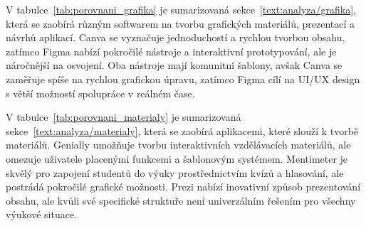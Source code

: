 V tabulce~\ref{tab:porovnani_grafika} je sumarizovaná sekce~\ref{text:analyza/grafika}, která se zaobírá různým softwarem na tvorbu grafických materiálů, prezentací a návrhů aplikací.
Canva se vyznačuje jednoduchostí a rychlou tvorbou obsahu, zatímco Figma nabízí pokročilé nástroje a interaktivní prototypování, ale je náročnější na osvojení. Oba nástroje mají komunitní šablony, avšak Canva se zaměřuje spíše na rychlou grafickou úpravu, zatímco Figma cílí na UI/UX design s větší možností spolupráce v reálném čase.


\begin{table}[ht!]
    \centering
    \caption{Porovnání aplikací na grafickou tvorbu}
    \label{tab:porovnani_grafika}
\end{table}

V tabulce~\ref{tab:porovnani_materialy} je sumarizovaná sekce~\ref{text:analyza/materialy}, která se zaobírá aplikacemi, které slouží k tvorbě materiálů.
Genially umožňuje tvorbu interaktivních vzdělávacích materiálů, ale omezuje uživatele placenými funkcemi a šablonovým systémem.
Mentimeter je skvělý pro zapojení studentů do výuky prostřednictvím kvízů a hlasování, ale postrádá pokročilé grafické možnosti. 
Prezi nabízí inovativní způsob prezentování obsahu, ale kvůli své specifické struktuře není univerzálním řešením pro všechny výukové situace.


